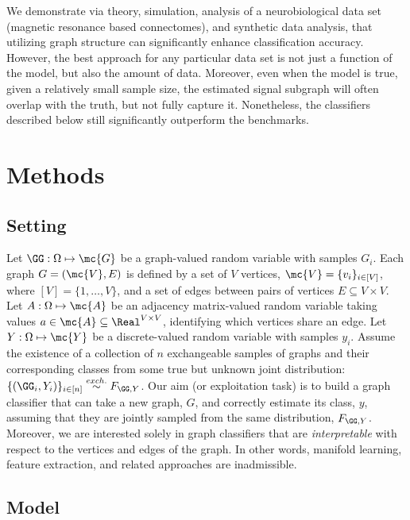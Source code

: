 \documentclass[10pt,journal,cspaper,compsoc]{IEEEtran}
\begin{document}
We demonstrate via theory, simulation, analysis of a neurobiological data set (magnetic resonance based connectomes), and synthetic data analysis, that utilizing graph structure can significantly enhance classification accuracy.  However, the best approach for any particular data set is not just a function of the model, but also the amount of data.  Moreover, even when the model is true, given a relatively small sample size, the estimated signal subgraph will often overlap with the truth, but not fully capture it.  Nonetheless, the classifiers described below still significantly outperform the benchmarks.

\section{Methods} %
\label{sec:methods}


\subsection{Setting}

Let $\GG: \Omega \mapsto \mc{G}$ be a graph-valued random variable with samples $G_i$.  Each graph $G=(\mc{V},E)$ is defined by a set of $V$ vertices, $\mc{V}=\{v_i\}_{i \in [V]}$, where $[V]=\{1,\ldots, V\}$, and a set of  edges between pairs of vertices $E \subseteq V \times V$. Let $A: \Omega \mapsto \mc{A}$ be an adjacency matrix-valued random variable taking values $a \in \mc{A} \subseteq \Real^{V \times V}$, identifying which vertices share an edge. Let $Y:\Omega \mapsto \mc{Y}$ be a discrete-valued random variable with samples $y_i$.  Assume the existence of a collection of $n$ exchangeable samples of graphs and their corresponding classes from some true but unknown joint distribution: $\{(\GG_i,Y_i)\}_{i \in [n]} \overset{exch.}{\sim} F_{\GG,Y}$. Our aim (or exploitation task) is to build a graph classifier that can take a new graph, $G$, and correctly estimate its class, $y$, assuming that they are jointly sampled from the same distribution, $F_{\GG,Y}$.  Moreover, we are interested solely in graph classifiers that are \emph{interpretable} with respect to the vertices and edges of the graph. In other words, manifold learning, feature extraction, and related approaches are inadmissible.  

\subsection{Model} %
\label{sub:model}
\end{document}
